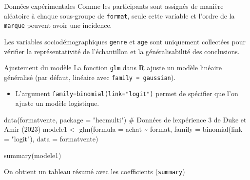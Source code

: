 \documentclass[
  ignorenonframetext,
]{beamer}
\newenvironment{Shaded}{\begin{snugshade}}{\end{snugshade}}
\newcommand{\AttributeTok}[1]{\textcolor[rgb]{0.40,0.45,0.13}{#1}}
\newcommand{\CommentTok}[1]{\textcolor[rgb]{0.37,0.37,0.37}{#1}}
\newcommand{\FunctionTok}[1]{\textcolor[rgb]{0.28,0.35,0.67}{#1}}
\newcommand{\NormalTok}[1]{\textcolor[rgb]{0.00,0.23,0.31}{#1}}
\newcommand{\OtherTok}[1]{\textcolor[rgb]{0.00,0.23,0.31}{#1}}
\newcommand{\SpecialCharTok}[1]{\textcolor[rgb]{0.37,0.37,0.37}{#1}}
\newcommand{\StringTok}[1]{\textcolor[rgb]{0.13,0.47,0.30}{#1}}
\providecommand{\tightlist}{%
  \setlength{\itemsep}{0pt}\setlength{\parskip}{0pt}}
\begin{document}
\begin{frame}[fragile]{Données expérimentales}
\protect{}\label{donnuxe9es-expuxe9rimentales}
Comme les participants sont assignés de manière aléatoire à chaque
sous-groupe de \texttt{format}, seule cette variable et l'ordre de la
\texttt{marque} peuvent avoir une incidence.

Les variables sociodémographiques \texttt{genre} et \texttt{age} sont
uniquement collectées pour vérifier la représentativité de l'échantillon
et la généralisabilité des conclusions.
\end{frame}

\begin{frame}[fragile]{Ajustement du modèle}
\protect{}\label{ajustement-du-moduxe8le}
La fonction \texttt{glm} dans \textbf{R} ajuste un modèle linéaire
généralisé (par défaut, linéaire avec \texttt{family\ =\ gaussian}).

\begin{itemize}
\tightlist
\item
  L'argument \texttt{family=binomial(link="logit")} permet de spécifier
  que l'on ajuste un modèle logistique.
\end{itemize}

\begin{Shaded}
\begin{Highlighting}[numbers=left,,]
\FunctionTok{data}\NormalTok{(formatvente, }\AttributeTok{package =} \StringTok{"hecmulti"}\NormalTok{)}
\CommentTok{\# Données de l\textquotesingle{}expérience 3 de Duke et Amir (2023)}
\NormalTok{modele1 }\OtherTok{\textless{}{-}} \FunctionTok{glm}\NormalTok{(}\AttributeTok{formula =}\NormalTok{ achat }\SpecialCharTok{\textasciitilde{}}\NormalTok{ format,}
            \AttributeTok{family =} \FunctionTok{binomial}\NormalTok{(}\AttributeTok{link =} \StringTok{"logit"}\NormalTok{),}
            \AttributeTok{data =}\NormalTok{ formatvente)}
\end{Highlighting}
\end{Shaded}

\begin{Shaded}
\begin{Highlighting}[numbers=left,,]
\FunctionTok{summary}\NormalTok{(modele1)}
\end{Highlighting}
\end{Shaded}

On obtient un tableau résumé avec les coefficients (\texttt{summary})
\end{frame}
\end{document}
